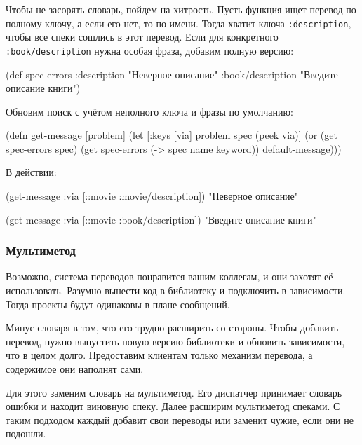 Чтобы не засорять словарь, пойдем на хитрость. Пусть функция ищет перевод по
полному ключу, а если его нет, то по имени. Тогда хватит ключа
\verb|:description|, чтобы все спеки сошлись в этот перевод. Если для
конкретного \verb|:book/description| нужна особая фраза, добавим полную
версию:

  \begin{clojure}
(def spec-errors
  {:description "Неверное описание"
   :book/description "Введите описание книги"})
  \end{clojure}

\noindent
Обновим поиск с учётом неполного ключа и фразы по умолчанию:

\begin{english}
  \begin{clojure}
(defn get-message
  [problem]
  (let [{:keys [via]} problem
        spec (peek via)]
    (or (get spec-errors spec)
        (get spec-errors (-> spec name keyword))
        default-message)))
  \end{clojure}
\end{english}

\noindent
В действии:

  \begin{clojure}
(get-message {:via [::movie :movie/description]})
"Неверное описание"

(get-message {:via [::movie :book/description]})
"Введите описание книги"
  \end{clojure}

\subsubsection{Мультиметод}

Возможно, система переводов понравится вашим коллегам, и они захотят её
использовать. Разумно вынести код в библиотеку и подключить в зависимости. Тогда
проекты будут одинаковы в плане сообщений.

Минус словаря в том, что его трудно расширить со стороны. Чтобы добавить
перевод, нужно выпустить новую версию библиотеки и обновить зависимости, что в
целом долго. Предоставим клиентам только механизм перевода, а содержимое они
наполнят сами.

Для этого заменим словарь на мультиметод. Его диспатчер принимает словарь ошибки
и находит виновную спеку. Далее расширим мультиметод спеками. С таким подходом
каждый добавит свои переводы или заменит чужие, если они не подошли.

